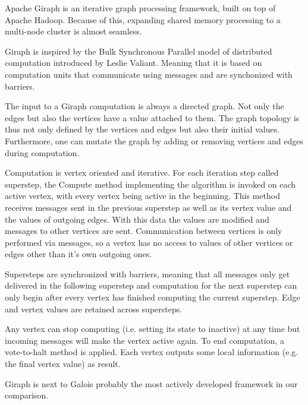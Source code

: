 

Apache Giraph\cite{Giraph} is an iterative graph processing framework, built on top of Apache Hadoop. Because of this, expanding shared memory processing to a multi-node cluster is almost seamless.

Giraph is inspired by the Bulk Synchronous Parallel model of distributed computation introduced by Leslie Valiant\cite{BSPforGiraph}. Meaning that it is based on computation units that communicate using messages and are synchonized with barriers.

The input to a Giraph computation is always a directed graph. Not only the edges but also the vertices have a value attached to them. The graph topology is thus not only defined by the vertices and edges but also their initial values.
Furthermore, one can mutate the graph by adding or removing vertices and edges during computation.

Computation is vertex oriented and iterative.
For each iteration step called superstep, the Compute method implementing the algorithm is invoked on each active vertex, with every vertex being active in the beginning.
This method receives messages sent in the previous superstep as well as its vertex value and the values of outgoing edges.
With this data the values are modified and messages to other vertices are sent.
Communication between vertices is only performed via messages, so a vertex has no access to values of other vertices or edges other than it's own outgoing ones.

Supersteps are synchronized with barriers, meaning that all messages only get delivered in the following superstep and computation for the next superstep can only begin after every vertex has finished computing the current superstep.
Edge and vertex values are retained across supersteps.

Any vertex can stop computing (i.e. setting its state to inactive) at any time but incoming messages will make the vertex active again.
To end computation, a vote-to-halt method is applied. Each vertex outputs some local information (e.g. the final vertex value) as result.

Giraph is next to Galois probably the most actively developed framework in our comparison.
